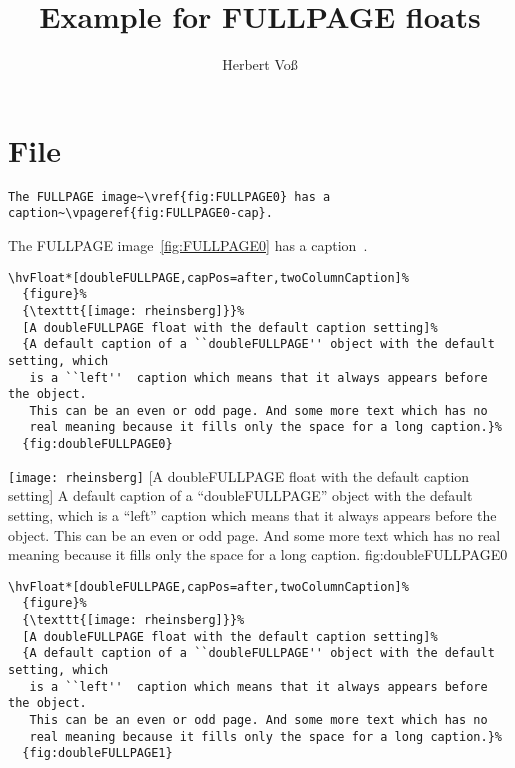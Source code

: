 \documentclass[twocolumn]{scrartcl}
\begin{document}
\title{Example for FULLPAGE floats}
\author{Herbert Voß}
\maketitle

\tableofcontents

\blinddocument

\section{File \texttt{\jobname}}

\begin{lstlisting}
The FULLPAGE image~\vref{fig:FULLPAGE0} has a caption~\vpageref{fig:FULLPAGE0-cap}.
\end{lstlisting}

The FULLPAGE image~\vref{fig:FULLPAGE0} has a caption~.

\begin{lstlisting}
\hvFloat*[doubleFULLPAGE,capPos=after,twoColumnCaption]%
  {figure}%
  {\texttt{[image: rheinsberg]}}%
  [A doubleFULLPAGE float with the default caption setting]%
  {A default caption of a ``doubleFULLPAGE'' object with the default setting, which
   is a ``left''  caption which means that it always appears before the object.
   This can be an even or odd page. And some more text which has no
   real meaning because it fills only the space for a long caption.}%
  {fig:doubleFULLPAGE0}
\end{lstlisting}


\Float[default]
%
  {\texttt{[image: rheinsberg]}}%
  [A doubleFULLPAGE float with the default caption setting]%
  {A default caption of a ``doubleFULLPAGE'' object with the default setting, which
   is a ``left''  caption which means that it always appears before the object.
   This can be an even or odd page. And some more text which has no
   real meaning because it fills only the space for a long caption.}%
  {fig:doubleFULLPAGE0}

\blinddocument

\begin{lstlisting}
\hvFloat*[doubleFULLPAGE,capPos=after,twoColumnCaption]%
  {figure}%
  {\texttt{[image: rheinsberg]}}%
  [A doubleFULLPAGE float with the default caption setting]%
  {A default caption of a ``doubleFULLPAGE'' object with the default setting, which
   is a ``left''  caption which means that it always appears before the object.
   This can be an even or odd page. And some more text which has no
   real meaning because it fills only the space for a long caption.}%
  {fig:doubleFULLPAGE1}
\end{lstlisting}
\end{document}
